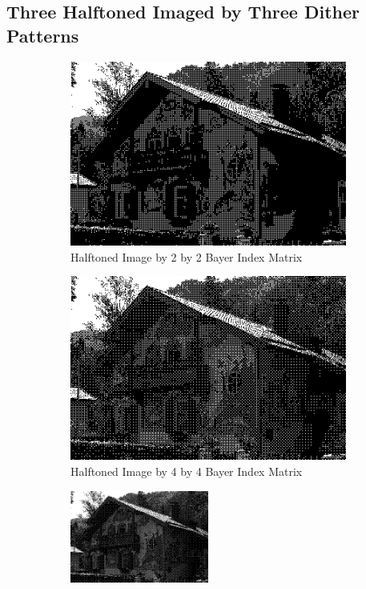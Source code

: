 \documentclass{article}
\begin{document}
\subsection{Three Halftoned Imaged by Three Dither Patterns}
	\begin{figure}[h]
		\begin{subfigure}{0.5\textwidth}
			\includegraphics[width=1.0\textwidth]{house_d2.png}
			\caption{Halftoned Image by 2 by 2 Bayer Index Matrix}
		\end{subfigure}
		\begin{subfigure}{0.5\textwidth}
			\includegraphics[width=1.0\textwidth]{house_d4.png}
			\caption{Halftoned Image by 4 by 4 Bayer Index Matrix}
		\end{subfigure}
		\begin{subfigure}{1.0\textwidth}
			\begin{center}
				\includegraphics[width=0.5\textwidth]{house_d8.png}

\end{center}
\end{subfigure}
\end{figure}
\end{document}
